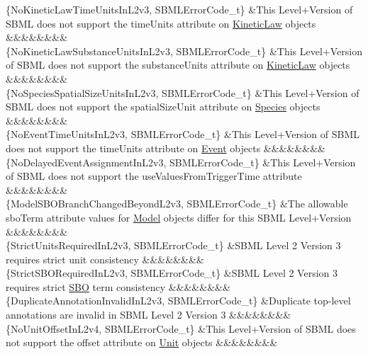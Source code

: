 \begin{DoxyParagraph}{}
\begin{longtabu}
\{No\+Kinetic\+Law\+Time\+Units\+In\+L2v3, S\+B\+M\+L\+Error\+Code\+\_\+t\} &This Level+\+Version of S\+B\+ML does not support the \textquotesingle{}time\+Units\textquotesingle{} attribute on \hyperlink{class_kinetic_law}{Kinetic\+Law} objects &&&&&&&&\\
\{No\+Kinetic\+Law\+Substance\+Units\+In\+L2v3, S\+B\+M\+L\+Error\+Code\+\_\+t\} &This Level+\+Version of S\+B\+ML does not support the \textquotesingle{}substance\+Units\textquotesingle{} attribute on \hyperlink{class_kinetic_law}{Kinetic\+Law} objects &&&&&&&&\\
\{No\+Species\+Spatial\+Size\+Units\+In\+L2v3, S\+B\+M\+L\+Error\+Code\+\_\+t\} &This Level+\+Version of S\+B\+ML does not support the \textquotesingle{}spatial\+Size\+Unit\textquotesingle{} attribute on \hyperlink{class_species}{Species} objects &&&&&&&&\\
\{No\+Event\+Time\+Units\+In\+L2v3, S\+B\+M\+L\+Error\+Code\+\_\+t\} &This Level+\+Version of S\+B\+ML does not support the \textquotesingle{}time\+Units\textquotesingle{} attribute on \hyperlink{class_event}{Event} objects &&&&&&&&\\
\{No\+Delayed\+Event\+Assignment\+In\+L2v3, S\+B\+M\+L\+Error\+Code\+\_\+t\} &This Level+\+Version of S\+B\+ML does not support the \textquotesingle{}use\+Values\+From\+Trigger\+Time\textquotesingle{} attribute &&&&&&&&\\
\{Model\+S\+B\+O\+Branch\+Changed\+Beyond\+L2v3, S\+B\+M\+L\+Error\+Code\+\_\+t\} &The allowable \textquotesingle{}sbo\+Term\textquotesingle{} attribute values for \hyperlink{class_model}{Model} objects differ for this S\+B\+ML Level+\+Version &&&&&&&&\\
\{Strict\+Units\+Required\+In\+L2v3, S\+B\+M\+L\+Error\+Code\+\_\+t\} &S\+B\+ML Level 2 Version 3 requires strict unit consistency &&&&&&&&\\
\{Strict\+S\+B\+O\+Required\+In\+L2v3, S\+B\+M\+L\+Error\+Code\+\_\+t\} &S\+B\+ML Level 2 Version 3 requires strict \hyperlink{class_s_b_o}{S\+BO} term consistency &&&&&&&&\\
\{Duplicate\+Annotation\+Invalid\+In\+L2v3, S\+B\+M\+L\+Error\+Code\+\_\+t\} &Duplicate top-\/level annotations are invalid in S\+B\+ML Level 2 Version 3 &&&&&&&&\\
\{No\+Unit\+Offset\+In\+L2v4, S\+B\+M\+L\+Error\+Code\+\_\+t\} &This Level+\+Version of S\+B\+ML does not support the \textquotesingle{}offset\textquotesingle{} attribute on \hyperlink{class_unit}{Unit} objects &&&&&&&&\\

\end{longtabu}
\end{DoxyParagraph}
